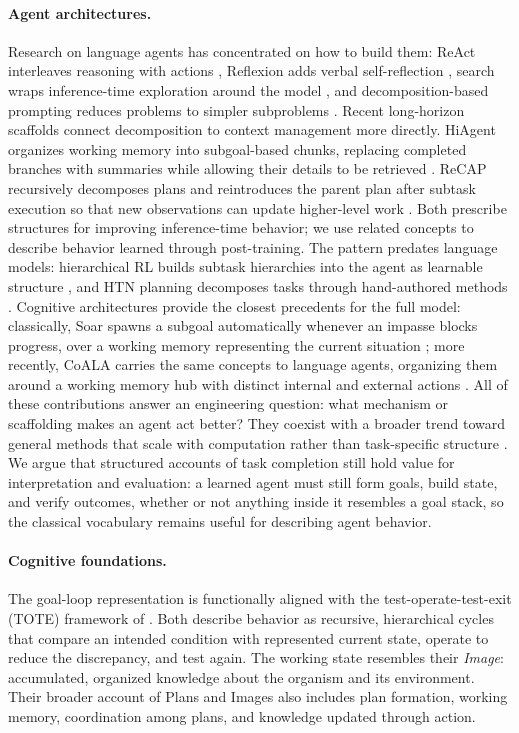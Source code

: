 \documentclass{article}
\begin{document}
\paragraph{Agent architectures.}
Research on language agents has concentrated on how to build them: ReAct interleaves reasoning with actions \citep{yao2023react}, Reflexion adds verbal self-reflection \citep{shinn2023reflexion}, search wraps inference-time exploration around the model \citep{yao2023tot, zhou2024lats}, and decomposition-based prompting reduces problems to simpler subproblems \citep{zhou2022least, prasad2024adapt}. Recent long-horizon scaffolds connect decomposition to context management more directly. HiAgent organizes working memory into subgoal-based chunks, replacing completed branches with summaries while allowing their details to be retrieved \citep{hu2025hiagent}. ReCAP recursively decomposes plans and reintroduces the parent plan after subtask execution so that new observations can update higher-level work \citep{zhang2025recap}. Both prescribe structures for improving inference-time behavior; we use related concepts to describe behavior learned through post-training. The pattern predates language models: hierarchical RL builds subtask hierarchies into the agent as learnable structure \citep{sutton1999options, dietterich2000maxq}, and HTN planning decomposes tasks through hand-authored methods \citep{ghallab2004automated}. Cognitive architectures provide the closest precedents for the full model: classically, Soar spawns a subgoal automatically whenever an impasse blocks progress, over a working memory representing the current situation \citep{laird1987soar}; more recently, CoALA carries the same concepts to language agents, organizing them around a working memory hub with distinct internal and external actions \citep{sumers2024coala}. All of these contributions answer an engineering question: what mechanism or scaffolding makes an agent act better? They coexist with a broader trend toward general methods that scale with computation rather than task-specific structure \citep{sutton2019bitter}. We argue that structured accounts of task completion still hold value for interpretation and evaluation: a learned agent must still form goals, build state, and verify outcomes, whether or not anything inside it resembles a goal stack, so the classical vocabulary remains useful for describing agent behavior.

\paragraph{Cognitive foundations.}
The goal-loop representation is functionally aligned with the test-operate-test-exit (TOTE) framework of \citet{miller1960plans}. Both describe behavior as recursive, hierarchical cycles that compare an intended condition with represented current state, operate to reduce the discrepancy, and test again. The working state resembles their \emph{Image}: accumulated, organized knowledge about the organism and its environment. Their broader account of Plans and Images also includes plan formation, working memory, coordination among plans, and knowledge updated through action.
\end{document}
